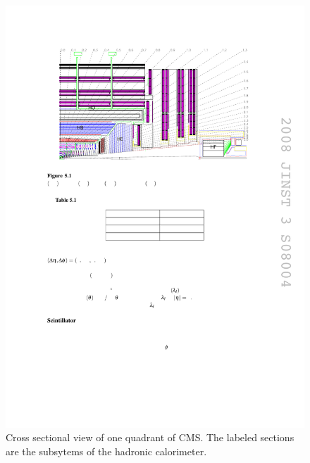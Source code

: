 \begin{figure}[tbh]
\centering
\includegraphics[width=6in]{figures/hcal.pdf}
\caption{Cross sectional view of one quadrant of CMS. The labeled sections are the subsytems of the hadronic calorimeter.}
\label{fig:hcal}
\end{figure}

